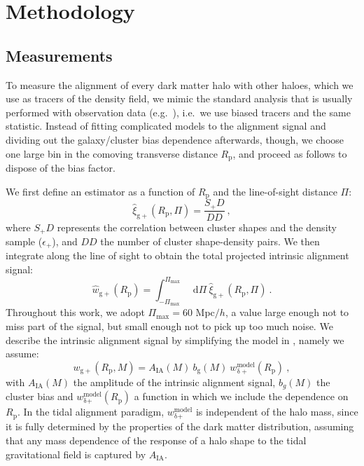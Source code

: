 \documentclass[a4paper,11pt]{article}
\newcommand*\dif{\mathop{}\!\mathrm{d}} 	%
\begin{document}
\section{Methodology}
\label{sec:method}
\subsection{Measurements}
\label{subsec:measurements}
To measure the alignment of every dark matter halo with other haloes, which we use as tracers of the density field, we mimic the standard analysis that is usually performed with observation data (e.g.\ \cite{vanUitertJoachimi2017}), i.e.\ we use biased tracers and the same statistic. Instead of fitting complicated models to the alignment signal and dividing out the galaxy/cluster bias dependence afterwards, though, we choose one large bin in the comoving transverse distance $R_{\mathrm{p}}$, and proceed as follows to dispose of the bias factor.

We first define an estimator as a function of $R_{\mathrm{p}}$ and the line-of-sight distance $\Pi$:
\begin{equation}
    \hat{\xi}_{\mathrm{g+}}(R_{\mathrm{p}}, \Pi) = \frac{S_+ D}{D D} \ ,
	\label{eq:xigphat}
\end{equation}
where $S_+ D$ represents the correlation between cluster shapes and the density sample ($\epsilon_{+}$), and $D D$ the number of cluster shape-density pairs. We then integrate along the line of sight to obtain the total projected intrinsic alignment signal:
\begin{equation}
   \hat{w}_{\mathrm{g+}} (R_{\mathrm{p}}) = \int _{-\Pi_{\mathrm{max}}}^{\Pi_{\mathrm{max}}} \dif \Pi \ \hat{\xi}_{\mathrm{g+}}(R_{\mathrm{p}}, \Pi) \ .
	\label{eq:wgphat}
\end{equation}
Throughout this work, we adopt $\Pi_{\mathrm{max}} = 60 $ Mpc$/h$, a value large enough not to miss part of the signal, but small enough not to pick up too much noise. 
We describe the intrinsic alignment signal by simplifying the model in \cite[equation 5]{vanUitertJoachimi2017}, namely we assume:
\begin{equation}
    w_{\mathrm{g+}} (R_{\mathrm{p}}, M)=A_{\mathrm{IA}} (M) \ b_{\mathrm{g}} (M)\ w_{\mathrm{\delta +}}^{\mathrm{model}} (R_{\mathrm{p}}) \ , 
	\label{eq:wgp}
\end{equation}
with $A_{\mathrm{IA}} (M)$ the amplitude of the intrinsic alignment signal, $b_g (M)$ the cluster bias and $w_{\mathrm{\delta} \mathrm{+}}^{\mathrm{model}} (R_{\mathrm{p}})$ a function in which we include the dependence on $R_{\mathrm{p}}$. In the tidal alignment paradigm, $w_{\mathrm{\delta} \mathrm{+}}^{\mathrm{model}}$ is independent of the halo mass, since it is fully determined by the properties of the dark matter distribution, assuming that any mass dependence of the response of a halo shape to the tidal gravitational field is captured by $A_{\mathrm{IA}}$. 
\end{document}
